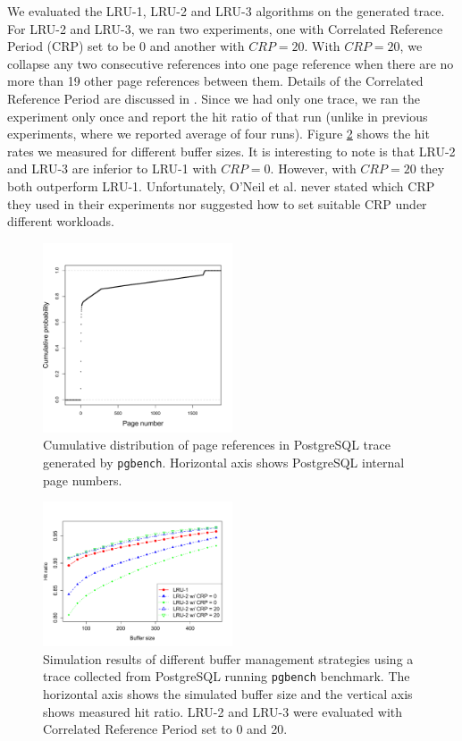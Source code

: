We evaluated the LRU-1, LRU-2 and LRU-3 algorithms on the generated trace. For LRU-2 and LRU-3, we ran two experiments, one with Correlated Reference Period (CRP) set to be 0 and another with $CRP = 20$. With $CRP = 20$, we collapse any two consecutive references into one page reference when there are no more than 19 other page references between them. Details of the Correlated Reference Period are discussed in \cite{lruk}. Since we had only one trace, we ran the experiment only once and report the hit ratio of that run (unlike in previous experiments, where we reported average of four runs). Figure \ref{fig:postgres} shows the hit rates we measured for different buffer sizes. It is interesting to note is that LRU-2 and LRU-3 are inferior to LRU-1 with $CRP = 0$. However, with $CRP = 20$ they both outperform LRU-1. Unfortunately, O'Neil et al. \cite{lruk} never stated which CRP they used in their experiments nor suggested how to set suitable CRP under different workloads.

\begin{figure}[t!]
    \centering
	\includegraphics[width=0.5\textwidth]{./figures/pages_requested.pdf}
	\caption{Cumulative distribution of page references in PostgreSQL trace generated by \texttt{pgbench}. Horizontal axis shows PostgreSQL internal page numbers.}
	\label{fig:references}
\end{figure}

\begin{figure}[t!]
    \centering
	\includegraphics[width=0.5\textwidth]{./figures/postgres.pdf}
	\caption{Simulation results of different buffer management strategies using a trace collected from PostgreSQL running \texttt{pgbench} benchmark. The horizontal axis shows the simulated buffer size and the vertical axis shows measured hit ratio. LRU-2 and LRU-3 were evaluated with Correlated Reference Period set to 0 and 20.}
	\label{fig:postgres}
\end{figure}
